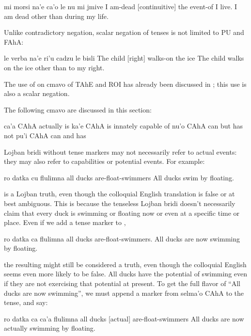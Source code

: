 \begin{example}
mi morsi na'e ca'o le nu mi jmive\n
I am-dead  [continuitive] the event-of I live.\n
I am dead other than during my life.
\end{example}

Unlike  contradictory negation, scalar negation of
    tenses is not limited to PU and FAhA:
\begin{example}
le verba na'e ri'u cadzu le bisli\n
The child  [right] walks-on the ice\n
The child walks on the ice other than to my right.
\end{example}

The use of  on cmavo of TAhE and ROI has already been
    discussed in ; this use is also a
    scalar negation.



The following cmavo are discussed in this section:

   ca'a    CAhA    actually is
    ka'e    CAhA    is innately capable of
    nu'o    CAhA    can but has not
    pu'i    CAhA    can and has

Lojban bridi without tense markers may not necessarily refer to
    actual events: they may also refer to capabilities or potential
    events. For example:
\begin{example}
ro datka cu flulimna\n
all ducks are-float-swimmers\n
All ducks swim by floating.
\end{example}

{\noindent}is a Lojban truth, even though the colloquial English
    translation is false or at best ambiguous. This is because the
    tenseless Lojban bridi doesn't necessarily claim that every
    duck is swimming or floating now or even at a specific time or
    place. Even if we add a tense marker to ,
\begin{example}
ro datka ca flulimna\n
all ducks  are-float-swimmers.\n
All ducks are now swimming by floating.
\end{example}

{\noindent}the resulting  might still be
    considered a truth, even though the colloquial English seems
    even more likely to be false. All ducks have the potential of
    swimming even if they are not exercising that potential at
    present. To get the full flavor of ``All ducks are now
    swimming'', we must append a marker from selma'o CAhA to the
    tense, and say:
\begin{example}
ro datka ca ca'a flulimna\n
all ducks  [actual] are-float-swimmers\n
All ducks are now actually swimming by floating.
\end{example}

